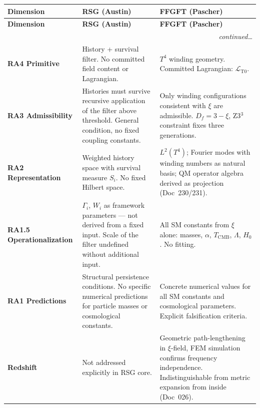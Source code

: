 \renewcommand{\arraystretch}{1.5}
{\small
\begin{longtable}{p{3.5cm}p{5.0cm}p{5.0cm}}
\toprule
\textbf{Dimension} & \textbf{RSG (Austin)} & \textbf{FFGFT (Pascher)} \\
\midrule
\endfirsthead
\toprule
\textbf{Dimension} & \textbf{RSG (Austin)} & \textbf{FFGFT (Pascher)} \\
\midrule
\endhead
\midrule\multicolumn{3}{r}{\footnotesize\itshape continued\ldots}\\\endfoot
\bottomrule\endlastfoot

\textbf{RA4 Primitive} &
History + survival filter. No committed field content or Lagrangian. &
$T^4$ winding geometry. Committed Lagrangian: $\mathcal{L}_{\text{T0}}$. \\

\midrule

\textbf{RA3 Admissibility} &
Histories must survive recursive application of the filter above threshold.
General condition, no fixed coupling constants. &
Only winding configurations consistent with $\xi$ are admissible.
$D_f = 3-\xi$, Z3$^3$ constraint fixes three generations. \\

\midrule

\textbf{RA2 Representation} &
Weighted history space with survival measure $S_i$. No fixed Hilbert space. &
$L^2(T^4)$; Fourier modes with winding numbers as natural basis;
QM operator algebra derived as projection (Doc~230/231). \\

\midrule

\textbf{RA1.5 Operationalization} &
$\Gamma_i$, $W_i$ as framework parameters — not derived from a fixed input.
Scale of the filter undefined without additional input. &
All SM constants from $\xi$ alone: masses, $\alpha$, $T_\text{CMB}$,
$\Lambda$, $H_0$. No fitting. \\

\midrule

\textbf{RA1 Predictions} &
Structural persistence conditions. No specific numerical predictions
for particle masses or cosmological constants. &
Concrete numerical values for all SM constants and cosmological
parameters. Explicit falsification criteria. \\

\midrule

\textbf{Redshift} &
Not addressed explicitly in RSG core. &
Geometric path-lengthening in $\xi$-field, FEM simulation confirms
frequency independence. Indistinguishable from metric expansion
from inside (Doc~026). \\


\end{longtable}}
